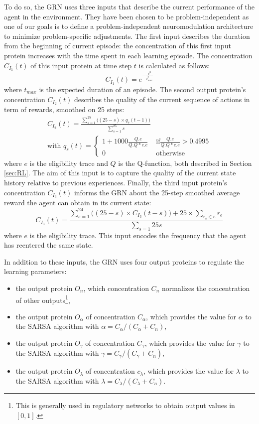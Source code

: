 To do so, the GRN uses three inputs that describe the current performance of the agent in the environment. They have been chosen to be problem-independent as one of our goals is to define a problem-independent neuromodulation architecture to minimize problem-specific adjustments. The first input describes the duration from the beginning of current episode: the concentration of this first input protein increases with the time spent in each learning episode. The concentration $C_{I_1}(t)$ of this input protein at time step $t$ is calculated as follows:
\begin{equation}
C_{I_1}(t)=e^{-\frac{t^2}{t_{max}^2}}
\end{equation}
where $t_{max}$ is the expected duration of an episode. The second output protein's concentration $C_{I_2}(t)$ describes the quality of the current sequence of actions in term of rewards, smoothed on 25 steps:
\begin{eqnarray}
C_{I_2}(t)=\frac{\sum\limits_{s=1}^{25}{\Big((25-s)\times q_s(t-1)\Big)}}{\sum\limits_{s=1}^{25}s} \\
\text{with }q_s(t)=
\begin{cases}
1+1000\frac{Q.e}{Q.Q*e.e} & \text{ if} \frac{Q.e}{Q.Q*e.e}>0.4995\\
0 & \text{ otherwise}
\end{cases}\nonumber
\end{eqnarray}
where $e$ is the eligibility trace and $Q$ is the Q-function, both described in Section \ref{sec:RL}. The aim of this input is to capture the quality of the current state history relative to previous experiences. Finally, the third input protein's concentration $C_{I_3}(t)$ informs the GRN about the 25-step smoothed average reward the agent can obtain in its current state:
\begin{equation}
C_{I_3}(t)=\frac{\sum\limits_{s=1}^{24}{\Big((25-s)\times C_{I_3}(t-s)\Big)}+25\times \sum\limits_{r_e\in e}{r_e}}{\sum\limits_{s=1}{25}s}
\end{equation}
where $e$ is the eligibility trace. This input encodes the frequency that the agent has reentered the same state. 

In addition to these inputs, the GRN uses four output proteins to regulate the learning parameters:
\begin{itemize}
\item the output protein $O_{n}$, which concentration $C_{n}$ normalizes the concentration of other outputs\footnote{This is generally used in regulatory networks to obtain output values in $[0, 1]$.},
\item the output protein $O_{\alpha}$ of concentration $C_{\alpha}$, which provides the value for $\alpha$ to the SARSA algorithm with $\alpha=C_{\alpha}/(C_\alpha+C_{n})$,
\item the output protein $O_\gamma$ of concentration $C_{\gamma}$, which provides the value for $\gamma$ to the SARSA algorithm with $\gamma=C_{\gamma}/(C_\gamma+C_{n})$,
\item the output protein $O_\lambda$ of concentration $c_{\lambda}$, which provides the value for $\lambda$ to the SARSA algorithm with $\lambda=C_{\lambda}/(C_\lambda+C_{n})$.
\end{itemize}

